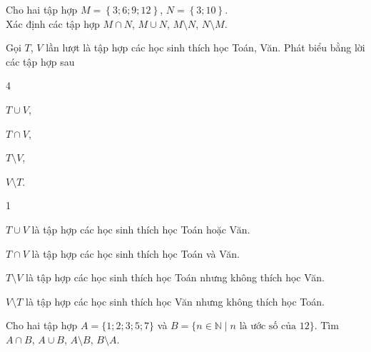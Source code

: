 \begin{bt}[1,0 điểm]%
	Cho hai tập hợp $M = \left\lbrace 3; 6; 9; 12\right\rbrace$, $N = \left\lbrace 3; 10\right\rbrace$.\\
	Xác định các tập hợp $M\cap N$, $M\cup N$, $M\setminus N$, $N\setminus M$.
\end{bt}

\begin{bt}[Mức độ 1]%
Gọi $T$, $V$ lần lượt là tập hợp các học sinh thích học Toán, Văn. Phát biểu bằng lời các tập hợp sau \begin{enumEX}[a)]{4}
\item $T\cup V$,
\item $T\cap V$,
\item $T\setminus V$,
\item $V\setminus T$.
\end{enumEX}
\loigiai
{\begin{enumEX}[a)]{1}
\item $T\cup V$ là tập hợp các học sinh thích học Toán hoặc Văn.
\item $T\cap V$ là tập hợp các học sinh thích học Toán và Văn.
\item $T\setminus V$ là tập hợp các học sinh thích học Toán nhưng không thích học Văn.
\item $V\setminus T$ là tập hợp các học sinh thích học Văn nhưng không thích học Toán.
\end{enumEX}
}
\end{bt}

\begin{bt}[Mức độ 1]%
Cho hai tập hợp $A=\{1;2;3;5;7\}$ và $B=\{n\in \mathbb{N}\mid n \text{ là ước số của } 12\}$. Tìm $A\cap B$, $A\cup B$, $A \setminus B$, $B \setminus A$.
\end{bt}

